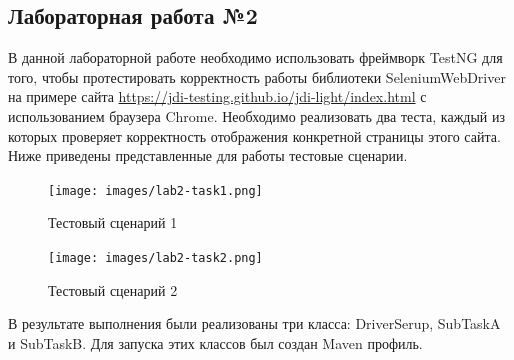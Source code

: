 \documentclass[a4paper]{article}
\begin{document}
    \subsection{Лабораторная работа №2}
    В данной лабораторной работе необходимо использовать фреймворк TestNG для того, чтобы протестировать корректность работы библиотеки SeleniumWebDriver на примере сайта \url{https://jdi-testing.github.io/jdi-light/index.html} с использованием браузера Chrome. Необходимо реализовать два теста, каждый из которых проверяет корректность отображения конкретной страницы этого сайта. Ниже приведены представленные для работы тестовые сценарии.
    \begin{figure}[H]
        \centering
        \begin{minipage}[t]{0.7\textwidth}
            \texttt{[image: images/lab2-task1.png]}
        \end{minipage}
        \caption{Тестовый сценарий 1}
    \end{figure}
    \begin{figure}[H]
        \centering
        \begin{minipage}[t]{0.7\textwidth}
            \texttt{[image: images/lab2-task2.png]}
        \end{minipage}
        \caption{Тестовый сценарий 2}
    \end{figure} \par
    В результате выполнения были реализованы три класса: DriverSerup, SubTaskA и SubTaskB. Для запуска этих классов был создан Maven профиль.
\end{document}
